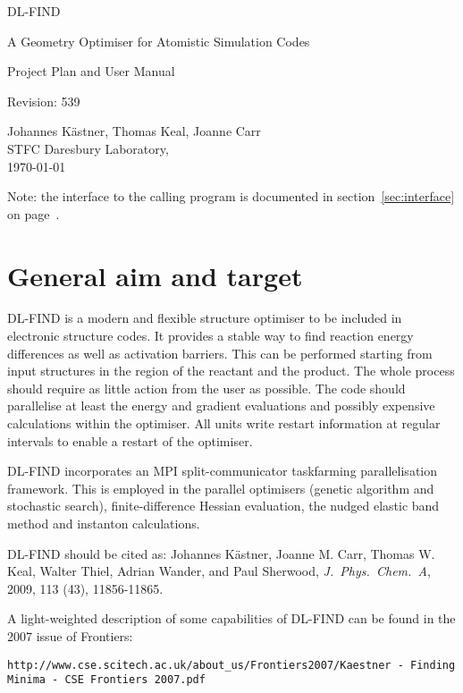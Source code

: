 \documentclass{article}
\begin{document}
\begin{center}
\LARGE
DL-FIND

\Large
A Geometry Optimiser for Atomistic Simulation Codes

\bigskip
\LARGE
Project Plan and User Manual

\bigskip
\normalsize    
$ $Revision: 539 $ $
 
Johannes K\"astner, Thomas Keal, Joanne Carr\\
STFC Daresbury Laboratory,\\
\today
\end{center}

Note: the interface to the calling program is documented in
section~\ref{sec:interface} on page~\pageref{sec:interface}.

\section{General aim and target}

DL-FIND is a modern and flexible structure optimiser to be included in
electronic structure codes. It provides a stable way to find reaction energy
differences as well as activation barriers. This can be performed starting
from input structures in the region of the reactant and the product.  The
whole process should require as little action from the user as possible.  The
code should parallelise at least the energy and gradient evaluations and
possibly expensive calculations within the optimiser. All units write restart
information at regular intervals to enable a restart of the optimiser.

DL-FIND incorporates an MPI split-communicator taskfarming 
parallelisation framework. This is employed in the parallel optimisers (genetic algorithm 
and stochastic search), finite-difference Hessian evaluation, the 
nudged elastic band method and instanton calculations.

DL-FIND should be cited as: Johannes K\"{a}stner, Joanne M. Carr, Thomas W. Keal, Walter Thiel, Adrian Wander, and Paul Sherwood,
\textit{J.~Phys.~Chem.~A}, 2009, 113 (43), 11856-11865.

A light-weighted description of some capabilities of DL-FIND can be found in
the 2007 issue of Frontiers: 

\texttt{http://www.cse.scitech.ac.uk/about\_us/Frontiers2007/Kaestner - Finding Minima - CSE Frontiers 2007.pdf}
\end{document}
